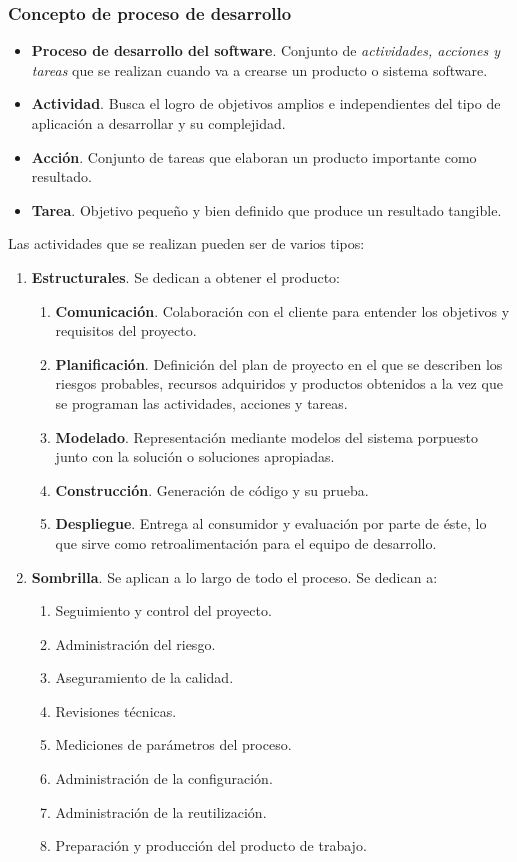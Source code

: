 \documentclass[12pt,spanish]{article}
\begin{document}
\subsubsection{Concepto de proceso de desarrollo}

\begin{itemize}
	\item \textbf{Proceso de desarrollo del software}. Conjunto de \emph{actividades, acciones y tareas} que se realizan cuando va a crearse un producto o sistema software.
	\item \textbf{Actividad}. Busca el logro de objetivos amplios e independientes del tipo de aplicación a desarrollar y su complejidad.
	\item \textbf{Acción}. Conjunto de tareas que elaboran un producto importante como resultado.
	\item \textbf{Tarea}. Objetivo pequeño y bien definido que produce un resultado tangible.
\end{itemize}

Las actividades que se realizan pueden ser de varios tipos:

\begin{enumerate}
	\item \textbf{Estructurales}. Se dedican a obtener el producto:
		\begin{enumerate}
			\item \textbf{Comunicación}. Colaboración con el cliente para entender los objetivos y requisitos del proyecto.
			\item \textbf{Planificación}. Definición del plan de proyecto en el que se describen los riesgos probables, recursos adquiridos y productos obtenidos a la vez que se programan las actividades, acciones y tareas.
			\item \textbf{Modelado}. Representación mediante modelos del sistema porpuesto junto con la solución o soluciones apropiadas.
			\item \textbf{Construcción}. Generación de código y su prueba.
			\item \textbf{Despliegue}. Entrega al consumidor y evaluación por parte de éste, lo que sirve como retroalimentación para el equipo de desarrollo.
		\end{enumerate}

	\item \textbf{Sombrilla}. Se aplican a lo largo de todo el proceso. Se dedican a:
		\begin{enumerate}
			\item Seguimiento y control del proyecto.
			\item Administración del riesgo.
			\item Aseguramiento de la calidad.
			\item Revisiones técnicas.
			\item Mediciones de parámetros del proceso.
			\item Administración de la configuración.
			\item Administración de la reutilización.
			\item Preparación y producción del producto de trabajo.
		\end{enumerate}
	
\end{enumerate}
\end{document}
